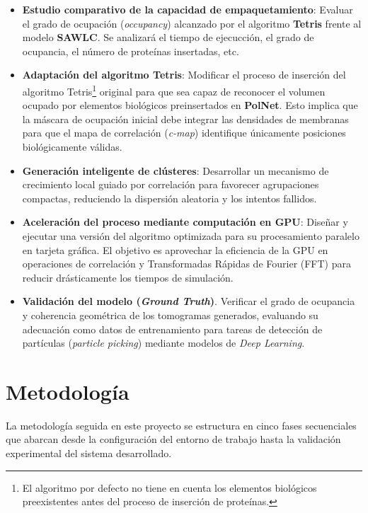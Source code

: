 \begin{itemize}
     \item \textbf{Estudio comparativo de la capacidad de empaquetamiento}: Evaluar el grado de ocupación (\textit{occupancy}) alcanzado por el algoritmo \textbf{Tetris} frente al modelo \textbf{SAWLC}. Se analizará el tiempo de ejecucción, el grado de ocupancia, el número de proteínas insertadas, etc.
    
    \item \textbf{Adaptación del algoritmo Tetris}: Modificar el proceso de inserción del algoritmo Tetris\footnote{El algoritmo por defecto no tiene en cuenta los elementos biológicos preexistentes antes del proceso de inserción de proteínas.} original para que sea capaz de reconocer el volumen ocupado por elementos biológicos preinsertados en \textbf{PolNet}. Esto implica que la máscara de ocupación inicial debe integrar las densidades de membranas para que el mapa de correlación (\textit{c-map}) identifique únicamente posiciones biológicamente válidas.
    
   \item \textbf{Generación inteligente de clústeres}: Desarrollar un mecanismo de crecimiento local guiado por correlación para favorecer agrupaciones compactas, reduciendo la dispersión aleatoria y los intentos fallidos.
    
    \item \textbf{Aceleración del proceso mediante computación en GPU}: Diseñar y ejecutar una versión del algoritmo optimizada para su procesamiento paralelo en tarjeta gráfica. El objetivo es aprovechar la eficiencia de la GPU en operaciones de correlación y Transformadas Rápidas de Fourier (FFT) para reducir drásticamente los tiempos de simulación.
    
    \item \textbf{Validación del modelo (\textit{Ground Truth})}. Verificar el grado de ocupancia y coherencia geométrica de los tomogramas generados, evaluando su adecuación como datos de entrenamiento para tareas de detección de partículas (\textit{particle picking}) mediante modelos de \textit{Deep Learning}.
\end{itemize}


\section{Metodología}

La metodología seguida en este proyecto se estructura en cinco fases secuenciales que abarcan desde la configuración del entorno de trabajo hasta la validación experimental del sistema desarrollado.

